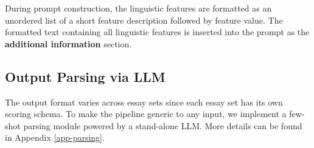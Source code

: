 
During prompt construction, the linguistic features are formatted as an unordered list of a short feature description followed by feature value. The formatted text containing all linguistic features is inserted into the prompt as the \textbf{additional information} section. 

\subsection{Output Parsing via LLM}
The output format varies across essay sets since each essay set has its own scoring schema. To make the pipeline generic to any input, we implement a few-shot parsing module powered by a stand-alone LLM. More details can be found in Appendix \ref{app-parsing}.